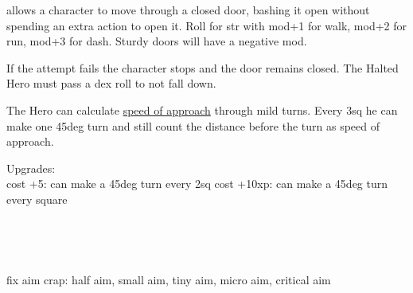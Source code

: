  allows a character to move through a closed door, bashing it open without spending an extra action to open it. Roll for str with mod+1 for walk, mod+2 for run, mod+3 for dash. Sturdy doors will have a negative mod.

If the attempt fails the character stops and the door remains closed. The Halted Hero must pass a dex roll to not fall down.


 The Hero can calculate \hyperref[approach]{speed of approach} through mild turns. Every 3sq he can make one 45deg turn and still count the distance before the turn as speed of approach.

\noindent
Upgrades:\\
cost +5: can make a 45deg turn every 2sq
cost +10xp: can make a 45deg turn every square

\

\

\todo fix aim crap: half aim, small aim, tiny aim, micro aim, critical aim

%
%
%
%
%
%
%
%
%

